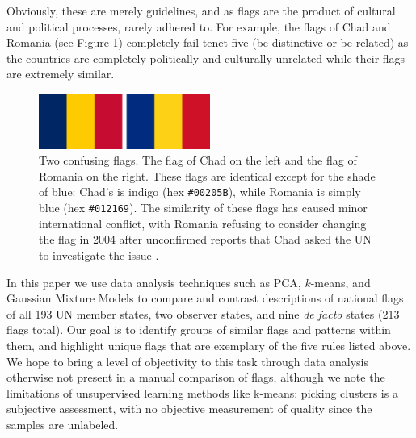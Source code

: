 \documentclass[11pt]{amsart}
\newcommand{\todo}[1]{\textcolor{red}{TODO: #1}}
\begin{document}
Obviously, these are merely guidelines, and as flags are the product of cultural
and political processes, rarely adhered to. For example, the flags of Chad and
Romania (see Figure \ref{fig:chad-romania}) completely fail tenet five (be distinctive or be related) as the
countries are completely politically and culturally unrelated while their flags are extremely similar.

\begin{figure}[h!]
    \centering
    \includegraphics[width=0.5\textwidth]{./res/left_chad_right_romania.png}
    \caption{Two confusing flags. The flag of Chad on the left and the flag of
    Romania on the right. These flags are identical except for the shade of
    blue: Chad's is indigo (hex \texttt{\#00205B}), while Romania is simply blue (hex
    \texttt{\#012169}). The similarity of these flags has caused minor international
    conflict, with Romania refusing to consider changing the flag in 2004 after
    unconfirmed reports that Chad asked the UN to investigate the issue
    \cite{bbc-identical-flag}. \label{fig:chad-romania}}
\end{figure}

In this paper we use data analysis techniques such as PCA, \(k\)-means, and
Gaussian Mixture Models to compare and contrast descriptions of national flags
of all 193 UN member states, two observer states, and nine \emph{de facto}
states (213 flags total). Our goal is to identify groups of similar flags and
patterns within them, and highlight unique flags that are exemplary of the five
rules listed above. We hope to bring a level of objectivity to this task through
data analysis otherwise not present in a manual comparison of flags, although we
note the limitations of unsupervised learning methods like k-means: picking
clusters is a subjective assessment, with no objective measurement of quality
since the samples are unlabeled.

\end{document}
